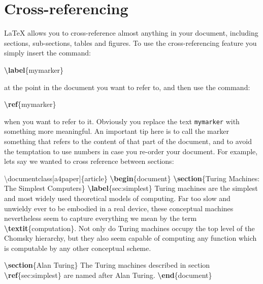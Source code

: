 \documentclass[
]{book}
\newenvironment{Shaded}{\begin{snugshade}}{\end{snugshade}}
\newcommand{\BuiltInTok}[1]{#1}
\newcommand{\ExtensionTok}[1]{#1}
\newcommand{\FunctionTok}[1]{\textcolor[rgb]{0.13,0.29,0.53}{\textbf{#1}}}
\newcommand{\KeywordTok}[1]{\textcolor[rgb]{0.13,0.29,0.53}{\textbf{#1}}}
\newcommand{\NormalTok}[1]{#1}
\begin{document}
\section{Cross-referencing}\label{cross-referencing}

LaTeX allows you to cross-reference almost anything in your document, including sections, sub-sections, tables and figures. To use the cross-referencing feature you simply insert the command:

\begin{Shaded}
\begin{Highlighting}[]
\KeywordTok{\textbackslash{}label}\NormalTok{\{}\ExtensionTok{mymarker}\NormalTok{\}}
\end{Highlighting}
\end{Shaded}

at the point in the document you want to refer to, and then use the command:

\begin{Shaded}
\begin{Highlighting}[]
\KeywordTok{\textbackslash{}ref}\NormalTok{\{}\ExtensionTok{mymarker}\NormalTok{\}}
\end{Highlighting}
\end{Shaded}

when you want to refer to it. Obviously you replace the text \texttt{mymarker} with something more meaningful. An important tip here is to call the marker something that refers to the content of that part of the document, and to avoid the temptation to use numbers in case you re-order your document. For example, lets say we wanted to cross reference between sections:

\begin{Shaded}
\begin{Highlighting}[]
\BuiltInTok{\textbackslash{}documentclass}\NormalTok{[a4paper]\{}\ExtensionTok{article}\NormalTok{\}}
\KeywordTok{\textbackslash{}begin}\NormalTok{\{}\ExtensionTok{document}\NormalTok{\}}
\KeywordTok{\textbackslash{}section}\NormalTok{\{Turing Machines: The Simplest Computers\}}
\KeywordTok{\textbackslash{}label}\NormalTok{\{}\ExtensionTok{sec:simplest}\NormalTok{\}}
\NormalTok{Turing machines are the simplest and most widely used theoretical models of computing. Far too slow and unwieldy ever to be embodied in a real device, these conceptual machines nevertheless seem to capture everything we mean by the term }\FunctionTok{\textbackslash{}textit}\NormalTok{\{computation\}. Not only do Turing machines occupy the top level of the Chomsky hierarchy, but they also seem capable of computing any function which is computable by any other conceptual scheme.}

\KeywordTok{\textbackslash{}section}\NormalTok{\{Alan Turing\}}
\NormalTok{The Turing machines described in section }\KeywordTok{\textbackslash{}ref}\NormalTok{\{}\ExtensionTok{sec:simplest}\NormalTok{\} are named after Alan Turing.}
\KeywordTok{\textbackslash{}end}\NormalTok{\{}\ExtensionTok{document}\NormalTok{\}}
\end{Highlighting}
\end{Shaded}
\end{document}
